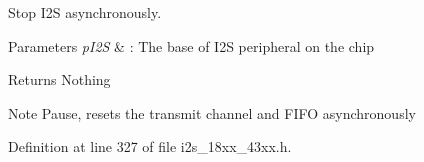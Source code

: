 Stop I2S asynchronously. 


\begin{DoxyParams}{Parameters}
{\em p\+I2S} & \+: The base of I2S peripheral on the chip \\
\hline
\end{DoxyParams}
\begin{DoxyReturn}{Returns}
Nothing 
\end{DoxyReturn}
\begin{DoxyNote}{Note}
Pause, resets the transmit channel and F\+I\+FO asynchronously 
\end{DoxyNote}


Definition at line 327 of file i2s\+\_\+18xx\+\_\+43xx.\+h.

